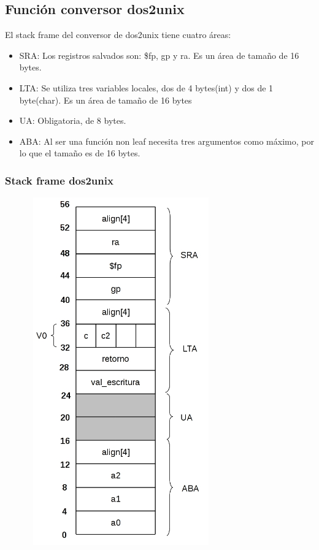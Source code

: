 \documentclass[a4paper,10pt]{article}
\begin{document}
  \subsection{Funci\'on conversor dos2unix}
  El stack frame del conversor de dos2unix tiene cuatro \'areas:
      \begin{itemize}
      \item SRA: Los registros salvados son: \$fp, gp y ra. Es un \'area de tama\~no de 16 bytes.
      \item LTA: Se utiliza tres variables locales, dos de 4 bytes(int) y dos de 1 byte(char). Es un \'area de tama\~no de 16 bytes
      \item UA: Obligatoria, de 8 bytes.
      \item ABA: Al ser una funci\'on non leaf necesita tres argumentos como m\'aximo, por lo que el tama\~no es de 16 bytes. 
    \end{itemize}
    \subsubsection{Stack frame dos2unix}
      \begin{center}
	\includegraphics[width=10cm, height=15cm]{DibujosStackFrame/stack-conversor-dos2unix.jpg}
      \end{center}
\end{document}

